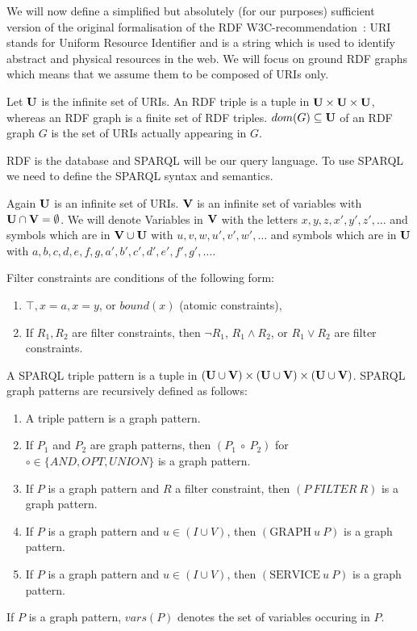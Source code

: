 We will now define a simplified but absolutely (for our purposes) sufficient version of the
original formalisation of the RDF W3C-recommendation~\cite{rdf}:
URI stands for Uniform Resource Identifier and is a string which is used to identify
abstract and physical resources in the web.
We will focus on ground RDF graphs which means that we assume them to be composed of URIs only.

\begin{definition}[RDF]
	Let $\mathbf{U}$ is the infinite set of URIs. An RDF triple is a tuple in $\mathbf{U} \times \mathbf{U} \times \mathbf{U}$, whereas an
	RDF graph is a finite set of RDF triples. $dom(G) \subseteq \mathbf{U}$ of an RDF graph $G$ is the set of URIs actually appearing in $G$.
\end{definition}

RDF is the database and SPARQL will be our query language. To use SPARQL we need
to define the SPARQL syntax and semantics.

\begin{definition}
	Again $\mathbf{U}$ is an infinite set of URIs. 
	$\mathbf{V}$ is an infinite set of variables with $\mathbf{U} \cap \mathbf{V} = \emptyset$. 
	We will denote Variables in $\mathbf{V}$ with the letters $x,y,z,x',y',z',\dots$ and
	symbols which are in $\mathbf{V} \cup \mathbf{U}$ with $u,v,w,u',v',w',\dots$ and
	symbols which are in $\mathbf{U}$ with $a,b,c,d,e,f,g,a',b',c',d',e',f',g',\dots$.
	
	Filter constraints are conditions of the following form:
	\begin{enumerate}
		\item $\top, x=a, x=y$, or $bound(x)$ (atomic constraints),
		\item If $R_1, R_2$ are filter constraints, then $\neg R_1$, $R_1 \land R_2$,
			or $R_1 \lor R_2$ are filter constraints.
	\end{enumerate}

	A SPARQL triple pattern is a tuple in  $(\mathbf{U} \cup \mathbf{V}) \times (\mathbf{U} \cup \mathbf{V}) \times (\mathbf{U} \cup \mathbf{V})$. 
	SPARQL graph patterns are recursively defined as follows:
	\begin{enumerate}
		\item A triple pattern is a graph pattern.
		\item If $P_1$ and $P_2$ are graph patterns, then $(P_1  \ \circ \ P_2)$ for
			$\circ \in \{ AND, OPT, UNION\}$ is a graph pattern.
		\item If $P$ is a graph pattern and $R$ a filter constraint, then $(P \ FILTER \ R)$ is a graph pattern.
		\item If $P$ is a graph pattern and $u \in (I \cup V)$, then $(\mbox{GRAPH} \  u \ P)$ is a graph pattern.
		\item If $P$ is a graph pattern and $u \in (I \cup V)$, then $(\mbox{SERVICE} \  u \ P)$ is a graph pattern.
	\end{enumerate}
If $P$ is a graph pattern, $vars(P)$ denotes the set of variables occuring in $P$.
\end{definition}

